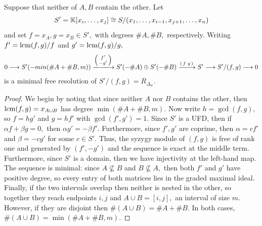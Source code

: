 \begin{lemma}
\label{lem: minimal free resolution of R_Delta}
    Suppose that neither of $A,B$ contain the other. 
    Let 
    \[
    S' = \mathbb{K}[x_i,\ldots,x_j]\cong S/(x_1,\ldots,x_{i-1},x_{j+1},\ldots,x_n) \]
    and set $f = x_{A},g = x_{B}\in S',$ with degrees $\#A,\#B,$ respectively. Writing $f' = \mathrm{lcm}(f,g)/f$ and $g'= \mathrm{lcm}(f,g)/g,$ 
    \begin{align}
        0\longrightarrow S'(-min(\#A + \#B, m))
        \xlongrightarrow{
            \begin{psmallmatrix}
            f' \\ -g' 
            \end{psmallmatrix}
        } 
        S'(-\#A)\oplus S'(-\#B)
        \xlongrightarrow{
            \begin{psmallmatrix}
            f & g
            \end{psmallmatrix}
        } 
        S'
        \longrightarrow S'/(f,g)
        \longrightarrow 0
    \end{align}
    is a minimal free resolution of $S'/(f,g) = R_{\Delta_w}.$
\end{lemma}

\begin{proof}
    We begin by noting that since neither $A$ nor $B$ contains the other, then $\mathrm{lcm}(f,g) = x_{A\cup B}$ has degree $\min(\#A+\#B,m).$
    Now write $h = \gcd(f,g),$ so $f = hg'$ and $g = hf'$ with $\gcd(f',g') = 1.$
    Since $S'$ is a UFD, then if $\alpha f + \beta g = 0,$ then $\alpha g' = -\beta f'.$ 
    Furthermore, since $f',g'$ are coprime, then $\alpha = cf'$ and $\beta = -cg'$ for some $c\in S'.$
    Thus, the syzygy module of $(f,g)$ is free of rank one and generated by $(f',-g')$ and the sequence is exact at the middle term. Furthermore, since $S'$ is a domain, then we have injectivity at the left-hand map.
    The sequence is minimal: since $A\not\subseteq B$ and $B\not\subseteq A,$ then both $f'$ and $g'$ have positive degree, so every entry of both matrices lies in the graded maximal ideal. 
    Finally, if the two intervals overlap then neither is nested in the other, so together they reach endpoints $i,j$ and $A\cup B = [i,j],$ an interval of size $m.$ 
    However, if they are disjoint then $\#(A\cup B) = \#A + \#B.$ In both cases, $\#(A\cup B) = \min(\#A + \#B, m).$
\end{proof}


